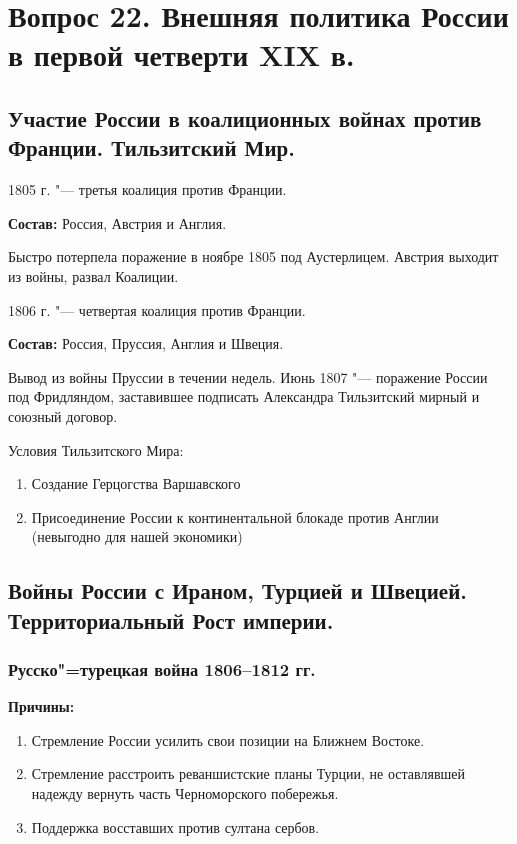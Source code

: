 \section{Вопрос 22. Внешняя политика России в первой четверти XIX в.}

\subsection{Участие России в коалиционных войнах против Франции. Тильзитский Мир.}

1805 г. "--- третья коалиция против Франции.

\textbf{Состав:} Россия, Австрия и Англия. 

Быстро потерпела поражение в ноябре 1805 под Аустерлицем. Австрия выходит из войны, развал Коалиции.

1806 г. "--- четвертая коалиция против Франции.

\textbf{Состав:} Россия, Пруссия, Англия и Швеция. 

Вывод из войны Пруссии в течении недель. Июнь 1807 "--- поражение России под Фридляндом, заставившее подписать Александра Тильзитский мирный и союзный договор.


Условия Тильзитского Мира:

\begin{enumerate}
    \item{ Создание Герцогства Варшавского }
    \item{ Присоединение России к континентальной блокаде против Англии (невыгодно для нашей экономики) }
\end{enumerate}

\subsection{Войны России с Ираном, Турцией и Швецией. Территориальный Рост империи.}

\subsubsection{Русско"=турецкая война 1806--1812 гг.}

\textbf{Причины:}

\begin{enumerate}
    \item{ Стремление России усилить свои позиции на Ближнем Востоке. }
    \item{ Стремление расстроить реваншистские планы Турции, не оставлявшей надежду вернуть часть Черноморского побережья. }
    \item{ Поддержка восставших против султана сербов. }
\end{enumerate}

